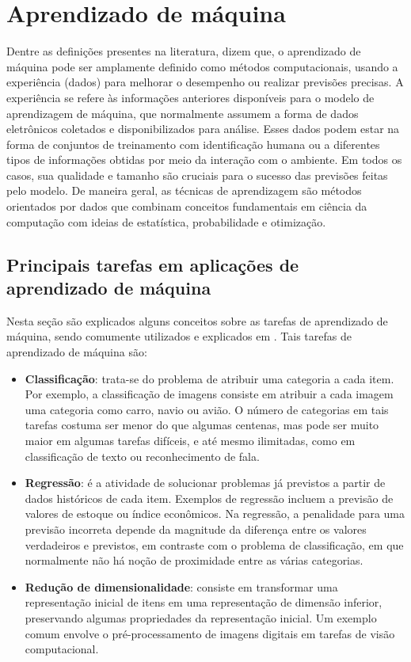 \documentclass[
	12pt,				%
	oneside,			%
	a4paper,			%
	english,			%
	brazil				%
	]{abntex2ppgsi}
\begin{document}
\section{Aprendizado de máquina}
Dentre as definições presentes na literatura,  dizem que, o aprendizado de máquina pode ser amplamente definido como métodos computacionais, usando a experiência (dados) para melhorar o desempenho ou realizar previsões precisas. A experiência se refere às informações anteriores disponíveis para o modelo de aprendizagem de máquina, que normalmente assumem a forma de dados eletrônicos coletados e disponibilizados para análise. Esses dados podem estar na forma de conjuntos de treinamento com identificação humana ou a diferentes tipos de informações obtidas por meio da interação com o ambiente. Em todos os casos, sua qualidade e tamanho são cruciais para o sucesso das previsões feitas pelo modelo. De maneira geral, as técnicas de aprendizagem são métodos orientados por dados que combinam conceitos fundamentais em ciência da computação com ideias de estatística, probabilidade e otimização.

\subsection{Principais tarefas em aplicações de aprendizado de máquina}
Nesta seção são explicados alguns conceitos sobre as tarefas de aprendizado de máquina, sendo comumente utilizados e explicados em . Tais tarefas de aprendizado de máquina são:

\begin{itemize}
  \item \textbf{Classificação}: trata-se do problema de atribuir uma categoria a cada item. Por exemplo, a classificação de imagens consiste em atribuir a cada imagem uma categoria como carro, navio ou avião. O número de categorias em tais tarefas costuma ser menor do que algumas centenas, mas pode ser muito maior em algumas tarefas difíceis, e até mesmo ilimitadas, como em classificação de texto ou reconhecimento de fala.

  \item \textbf{Regressão}: é a atividade de solucionar problemas já previstos a partir de dados históricos de cada item. Exemplos de regressão incluem a previsão de valores de estoque ou índice econômicos. Na regressão, a penalidade para uma previsão incorreta depende da magnitude da diferença entre os valores verdadeiros e previstos, em contraste com o problema de classificação, em que normalmente não há noção de proximidade entre as várias categorias.

  \item \textbf{Redução de dimensionalidade}: consiste em transformar uma representação inicial de itens em uma representação de dimensão inferior, preservando algumas propriedades da representação inicial. Um exemplo comum envolve o pré-processamento de imagens digitais em tarefas de visão computacional.
\end{itemize}
\end{document}
